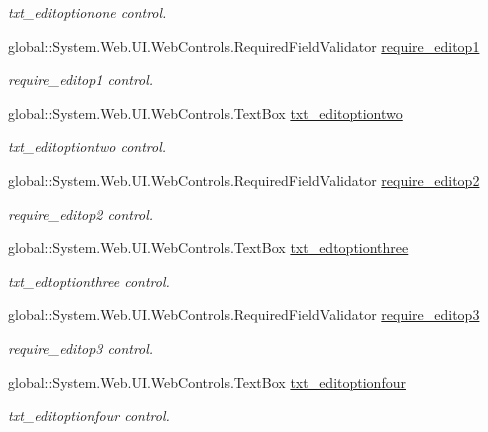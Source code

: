 \begin{DoxyCompactItemize}
\begin{DoxyCompactList}\small\item\em txt\+\_\+editoptionone control. \end{DoxyCompactList}\item 
global\+::\+System.\+Web.\+U\+I.\+Web\+Controls.\+Required\+Field\+Validator \mbox{\hyperlink{class_admin__editquestion_aff043281ccaa424ebadfa8573dc9a17f}{require\+\_\+editop1}}
\begin{DoxyCompactList}\small\item\em require\+\_\+editop1 control. \end{DoxyCompactList}\item 
global\+::\+System.\+Web.\+U\+I.\+Web\+Controls.\+Text\+Box \mbox{\hyperlink{class_admin__editquestion_a9dd14979b48cbe29113aaada9f94f52d}{txt\+\_\+editoptiontwo}}
\begin{DoxyCompactList}\small\item\em txt\+\_\+editoptiontwo control. \end{DoxyCompactList}\item 
global\+::\+System.\+Web.\+U\+I.\+Web\+Controls.\+Required\+Field\+Validator \mbox{\hyperlink{class_admin__editquestion_a073a1b8e23006348cffd7c09da8261f4}{require\+\_\+editop2}}
\begin{DoxyCompactList}\small\item\em require\+\_\+editop2 control. \end{DoxyCompactList}\item 
global\+::\+System.\+Web.\+U\+I.\+Web\+Controls.\+Text\+Box \mbox{\hyperlink{class_admin__editquestion_a1bb8c99813f44dbb8f1c3ee9b961de63}{txt\+\_\+edtoptionthree}}
\begin{DoxyCompactList}\small\item\em txt\+\_\+edtoptionthree control. \end{DoxyCompactList}\item 
global\+::\+System.\+Web.\+U\+I.\+Web\+Controls.\+Required\+Field\+Validator \mbox{\hyperlink{class_admin__editquestion_ac041ec1190c4f6a8200b74d022ddd112}{require\+\_\+editop3}}
\begin{DoxyCompactList}\small\item\em require\+\_\+editop3 control. \end{DoxyCompactList}\item 
global\+::\+System.\+Web.\+U\+I.\+Web\+Controls.\+Text\+Box \mbox{\hyperlink{class_admin__editquestion_a6ed5c7c4962ca805e2fc2f6658a4b190}{txt\+\_\+editoptionfour}}
\begin{DoxyCompactList}\small\item\em txt\+\_\+editoptionfour control. \end{DoxyCompactList}\item 

\end{DoxyCompactItemize}
